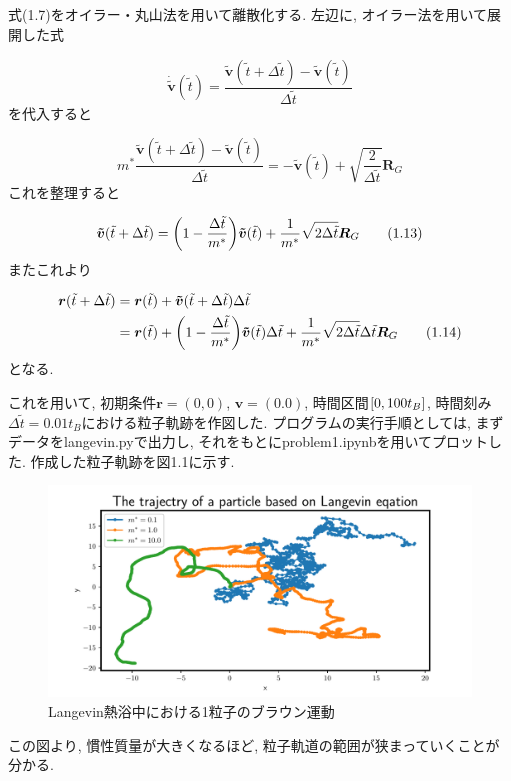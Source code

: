 \documentclass[a4paper,dvipdfmx]{jarticle}
\begin{document}
\newpage


\subsection{}
\noindent
式(1.7)をオイラー・丸山法を用いて離散化する.
左辺に, オイラー法を用いて展開した式

\begin{equation}
    \bm{\dot{\tilde{v}}}(\tilde{t}) 
    = \frac{\bm{\tilde{v}}(\tilde{t}+\Delta \tilde{t})-\bm{\tilde{v}}(\tilde{t})}{\Delta \tilde{t}}
    \tag{1.11}
\end{equation}
を代入すると

\begin{equation}
    m^* \frac{\bm{\tilde{v}}(\tilde{t}+\Delta \tilde{t})-\bm{\tilde{v}}(\tilde{t})}{\Delta \tilde{t}}
    = -\bm{\tilde{v}}(\tilde{t}) + \sqrt{\frac{2}{\Delta \tilde{t}}}\bm{R}_G \tag{1.12}
\end{equation}
これを整理すると

\begin{equation}    
    \bm{\tilde{v}}(\tilde{t}+\Delta \tilde{t}) = \qty(1-\frac{\Delta \tilde{t}}{m^*})\bm{\tilde{v}}(\tilde{t})
    + \frac{1}{m^*}\sqrt{2\Delta \tilde{t}}\bm{R}_G  \tag{1.13}
\end{equation}
またこれより

\begin{align*}
    \bm{r}(\tilde{t}+\Delta \tilde{t}) &= \bm{r}(\tilde{t}) + \bm{\tilde{v}}(\tilde{t}+\Delta \tilde{t})\Delta \tilde{t} \\
    &= \bm{r}(\tilde{t}) + \qty(1-\frac{\Delta \tilde{t}}{m^*})\bm{\tilde{v}}(\tilde{t})\Delta \tilde{t}
    + \frac{1}{m^*}\sqrt{2\Delta \tilde{t}}\Delta \tilde{t}\bm{R}_G \tag{1.14}
\end{align*}
となる.

\noindent
これを用いて, 初期条件$\bm{r}=(0,0)$, $\bm{v}=(0.0)$, 時間区間$\qty[0, 100t_B]$, 時間刻み$\Delta \tilde{t}=0.01t_B$における粒子軌跡を作図した.
プログラムの実行手順としては, まずデータをlangevin.pyで出力し, それをもとにproblem1.ipynbを用いてプロットした.
作成した粒子軌跡を図1.1に示す.

\begin{figure}[H]
    \centering
    \includegraphics[scale=0.6]{problem_1/1-4/problem1-4.pdf}
    \caption{Langevin熱浴中における1粒子のブラウン運動}
\end{figure}
この図より, 慣性質量が大きくなるほど, 粒子軌道の範囲が狭まっていくことが分かる.
\end{document}
